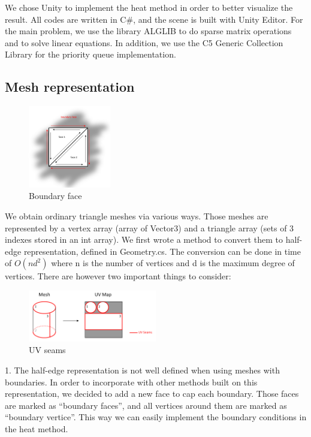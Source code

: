 \documentclass[a4paper,12pt,twoside]{article}
\begin{document}
We chose Unity to implement the heat method in order to better visualize the result. All codes are written in C\#, and the scene is built with Unity Editor. For the main problem, we use the library ALGLIB to do sparse matrix operations and to solve linear equations. In addition, we use the C5 Generic Collection Library for the priority queue implementation.


\subsection{Mesh representation}

\begin{figure}
	\centering
	\includegraphics[width=0.32\textwidth]{F2.png}
	\caption{Boundary face}
\end{figure}

We obtain ordinary triangle meshes via various ways. Those meshes are represented by a vertex array (array of Vector3) and a triangle array (sets of 3 indexes stored in an int array). We first wrote a method to convert them to half-edge representation, defined in Geometry.cs. The conversion can be done in time of $O(nd^2)$ where n is the number of vertices and d is the maximum degree of vertices. There are however two important things to consider:

\begin{figure}
	\centering
	\includegraphics[width=0.5\textwidth]{F1.png}
	\caption{UV seams}
\end{figure}


1. The half-edge representation is not well defined when using meshes with boundaries. In order to incorporate with other methods built on this representation, we decided to add a new face to cap each boundary. Those faces are marked as ``boundary faces'', and all vertices around them are marked as ``boundary vertice''. This way we can easily implement the boundary conditions in the heat method.
\end{document}
